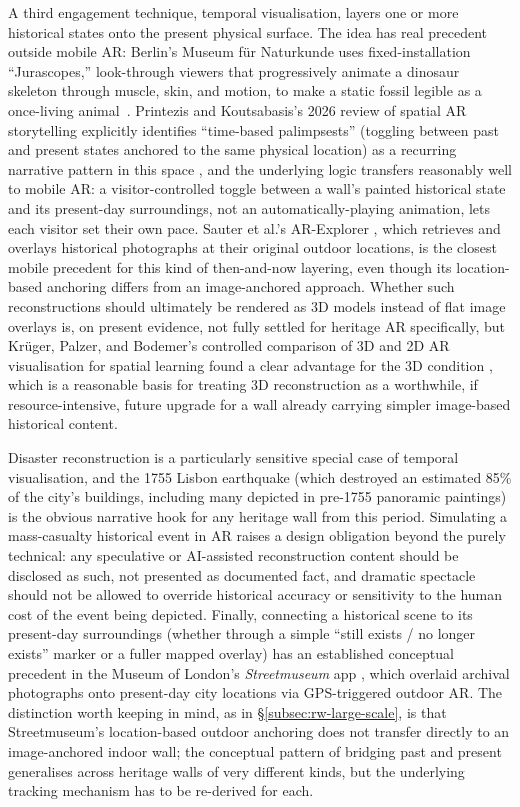 A third engagement technique, temporal visualisation, layers one or more
historical states onto the present physical surface. The idea has real
precedent outside mobile AR: Berlin's Museum f\"ur Naturkunde uses
fixed-installation ``Jurascopes,'' look-through viewers that progressively
animate a dinosaur skeleton through muscle, skin, and motion, to make a
static fossil legible as a once-living animal~\cite{jurascope2026}. Printezis
and Koutsabasis's 2026 review of spatial AR storytelling explicitly
identifies ``time-based palimpsests'' (toggling between past and present states anchored to the same physical location) as a recurring narrative
pattern in this space \cite{printezis2026}, and the underlying logic
transfers reasonably well to mobile AR: a visitor-controlled toggle between
a wall's painted historical state and its present-day surroundings, not
an automatically-playing animation, lets each visitor set their own
pace. Sauter et al.'s AR-Explorer \cite{sauter2024}, which retrieves and
overlays historical photographs at their original outdoor locations, is the
closest mobile precedent for this kind of then-and-now layering, even though
its location-based anchoring differs from an image-anchored approach.
Whether such reconstructions should ultimately be rendered as 3D models
instead of flat image overlays is, on present evidence, not fully settled
for heritage AR specifically, but Kr\"uger, Palzer, and Bodemer's controlled
comparison of 3D and 2D AR visualisation for spatial learning found a clear
advantage for the 3D condition \cite{kruger2021}, which is a reasonable basis for
treating 3D reconstruction as a worthwhile, if resource-intensive, future
upgrade for a wall already carrying simpler image-based historical content.

Disaster reconstruction is a particularly sensitive special case of temporal
visualisation, and the 1755 Lisbon earthquake (which destroyed an estimated 85\% of the city's buildings, including many depicted in pre-1755 panoramic paintings) is the obvious narrative hook for any
heritage wall from this period. Simulating a mass-casualty historical event
in AR raises a design obligation beyond the purely technical: any
speculative or AI-assisted reconstruction content should be disclosed as
such, not presented as documented fact, and dramatic spectacle should
not be allowed to override historical accuracy or sensitivity to the human
cost of the event being depicted. Finally, connecting a historical scene to
its present-day surroundings (whether through a simple ``still exists / no longer exists'' marker or a fuller mapped overlay) has an
established conceptual precedent in the Museum of London's
\emph{Streetmuseum} app \cite{streetmuseum}, which overlaid archival photographs onto present-day
city locations via GPS-triggered outdoor AR. The distinction worth keeping in
mind, as in \S\ref{subsec:rw-large-scale}, is that Streetmuseum's
location-based outdoor anchoring does not transfer directly to an
image-anchored indoor wall; the conceptual pattern of bridging past and
present generalises across heritage walls of very different kinds, but the
underlying tracking mechanism has to be re-derived for each.

